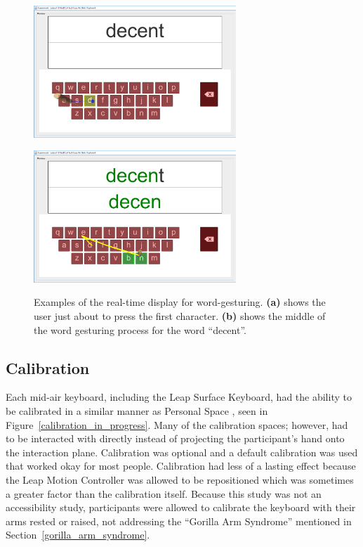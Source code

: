 \begin{figure}[h]
	\centering
	\begin{minipage}[t]{2.9in}
		\includegraphics[width=3in]{fig_update1_keyboard}
		\label{update_a}
	\end{minipage}
	\begin{minipage}[t]{2.9in}
		\includegraphics[width=3in]{fig_update2_keyboard}
		\label{update_b}
	\end{minipage}
	\caption[Display: Real-time Updates]{Examples of the real-time display for word-gesturing. \textbf{(a)} shows the user just about to press the first character. \textbf{(b)} shows the middle of the word gesturing process for the word ``decent''.}
	\label{display_area}
\end{figure}

\subsection{Calibration}
Each mid-air keyboard, including the Leap Surface Keyboard, had the ability to be calibrated in a similar manner as Personal Space \cite{ref_alvin_thesis}, seen in Figure~\ref{calibration_in_progress}. Many of the calibration spaces; however, had to be interacted with directly instead of projecting the participant's hand onto the interaction plane. Calibration was optional and a default calibration was used that worked okay for most people. Calibration had less of a lasting effect because the Leap Motion Controller was allowed to be repositioned which was sometimes a greater factor than the calibration itself. Because this study was not an accessibility study, participants were allowed to calibrate the keyboard with their arms rested or raised, not addressing the ``Gorilla Arm Syndrome'' mentioned in Section~\ref{gorilla_arm_syndrome}.

